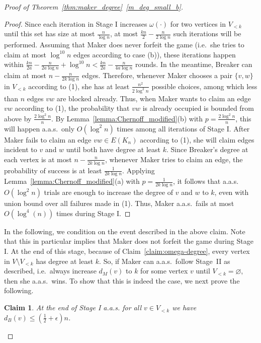 \documentclass[11pt, a4paper]{article}
\numberwithin{equation}{section}
\numberwithin{figure}{section}
\newtheorem{claim}[theorem]{Claim}
\begin{document}
\begin{proof}[Proof of Theorem~\ref{thm:maker_degree}~\ref{m_deg_small_b}]
	\begin{proof}
	Since each iteration in Stage I increases $\omega(\cdot)$
	for two vertices in $V_{<k}$ until 
	this set has size at most $\frac{n}{\log n}$,
    at most $\frac{kn}{2}-\frac{n}{2\log n}$ such iterations 
    will be performed. Assuming that Maker does never forfeit 
    the game (i.e.~she tries to claim at most $\log^{10}n$ 
    edges according to case (b)), 
    these iterations happen within
    $\frac{kn}{2a}-\frac{n}{2a\log n} + \log^{10}n	
    < \frac{kn}{2a}-\frac{n}{4a\log n}$
	rounds. In the meantime, Breaker can claim
	at most
	$n - \frac{n}{2k\log n}$
	edges.
	Therefore, whenever Maker chooses a pair 
	$\{v,w\}$ in $V_{<k}$ according to (1), 
	she has at least $\frac{n^2}{2\log^2n}$ possible choices, 
	among which less than $n$ edges $vw$ are blocked already. 
	Thus, when Maker wants to claim an edge $vw$
	according to (1), 
	the probability that $vw$ is already occupied is 
	bounded from above by $\frac{2\log^2 n}{n}$. 
	By Lemma~\ref{lemma:Chernoff_modified}(b)
	with $p=\frac{2\log^2 n}{n}$,
	this will happen a.a.s.~only $O(\log^2 n)$ 
	times among all iterations of Stage I. 
	After Maker fails to claim an edge 
	$vw \in E(K_n)$ according to (1), she 
	will claim edges incident to $v$ and $w$ until 
	both have 
	degree at least $k$. Since Breaker's degree at 
	each vertex 
	is at most $n - \frac{n}{2k\log{n}}$, 
	whenever Maker 
	tries to claim an edge, the probability 
	of success is at least
	$\frac{1}{2k\log n}$. 
	Applying Lemma~\ref{lemma:Chernoff_modified}(a)
	with $p=\frac{1}{2k\log n}$,
	it follows that a.a.s. $O(\log^2 n)$ trials 
	are enough to increase the degree of 
	$v$ and $w$ to $k$,
	even with union bound over all 
	failures made in (1). 
	Thus, Maker a.a.s.~fails at most $O(\log^4(n))$ 
	times during Stage I. 
	\end{proof}

	In the following, we condition on the event described in 
	the above claim. Note that this in particular implies that
	Maker does not forfeit the game during Stage I.
	At the end of this stage, because of 
	Claim~\ref{claim:omega-degree}, every vertex in 
	$V\setminus V_{<k}$ has degree at least $k$.
    So, if Maker can a.a.s.~follow Stage~II as described, 
    i.e.~always increase $d_M(v)$ to $k$ for some vertex $v$
    until $V_{<k}=\varnothing$, 
    then she a.a.s.~wins. To show that this is indeed the case, 
    we next prove the following.

	\begin{claim}\label{clm:mindeg:dB-bound}
		At the end of Stage I a.a.s. 
		for all $v \in V_{<k}$ we have 
		$d_B(v) \leq (\frac{1}{2} + \epsilon)n$.
	\end{claim}


\end{proof}
\end{document}

